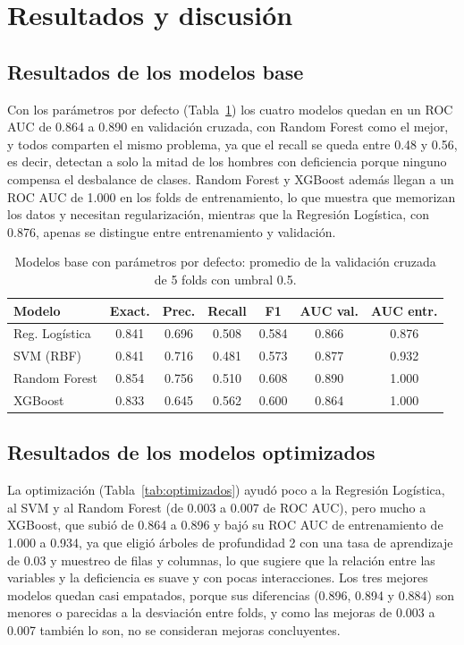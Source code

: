 \documentclass[conference]{IEEEtran}
\begin{document}
\section{Resultados y discusión}
\label{sec:resultados}

\subsection{Resultados de los modelos base}

Con los parámetros por defecto (Tabla~\ref{tab:defecto}) los cuatro modelos quedan en un ROC AUC de 0.864 a 0.890 en validación cruzada, con Random Forest como el mejor, y todos comparten el mismo problema, ya que el recall se queda entre 0.48 y 0.56, es decir, detectan a solo la mitad de los hombres con deficiencia porque ninguno compensa el desbalance de clases. Random Forest y XGBoost además llegan a un ROC AUC de 1.000 en los folds de entrenamiento, lo que muestra que memorizan los datos y necesitan regularización, mientras que la Regresión Logística, con 0.876, apenas se distingue entre entrenamiento y validación.

\begin{table}[t]
\centering
\footnotesize
\setlength{\tabcolsep}{3pt}
\caption{Modelos base con parámetros por defecto: promedio de la validación cruzada de 5 folds con umbral 0.5.}
\label{tab:defecto}
\begin{tabular}{l c c c c c c}
\toprule
Modelo & Exact. & Prec. & Recall & F1 & AUC val. & AUC entr. \\
\midrule
Reg. Logística & 0.841 & 0.696 & 0.508 & 0.584 & 0.866 & 0.876 \\
SVM (RBF) & 0.841 & 0.716 & 0.481 & 0.573 & 0.877 & 0.932 \\
Random Forest & 0.854 & 0.756 & 0.510 & 0.608 & 0.890 & 1.000 \\
XGBoost & 0.833 & 0.645 & 0.562 & 0.600 & 0.864 & 1.000 \\
\bottomrule
\end{tabular}
\end{table}

\subsection{Resultados de los modelos optimizados}

La optimización (Tabla~\ref{tab:optimizados}) ayudó poco a la Regresión Logística, al SVM y al Random Forest (de 0.003 a 0.007 de ROC AUC), pero mucho a XGBoost, que subió de 0.864 a 0.896 y bajó su ROC AUC de entrenamiento de 1.000 a 0.934, ya que eligió árboles de profundidad 2 con una tasa de aprendizaje de 0.03 y muestreo de filas y columnas, lo que sugiere que la relación entre las variables y la deficiencia es suave y con pocas interacciones. Los tres mejores modelos quedan casi empatados, porque sus diferencias (0.896, 0.894 y 0.884) son menores o parecidas a la desviación entre folds, y como las mejoras de 0.003 a 0.007 también lo son, no se consideran mejoras concluyentes.
\end{document}
